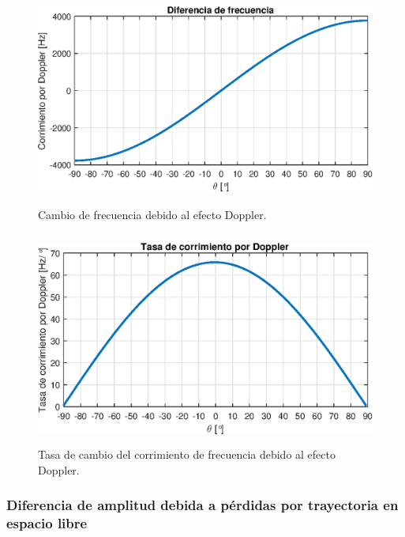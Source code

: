 \documentclass{article}
\newenvironment{standalone}{\begin{preview}}{\end{preview}}
\begin{document}
\begin{standalone}
  \begin{figure}[!htbp]
    \centering
    \includegraphics[width=\linewidth, height=70mm, keepaspectratio]{../images/doppler-shift.eps}
    \caption{Cambio de frecuencia debido al efecto Doppler.}
    \label{fig:doppler-shift}
  \end{figure}

  \begin{figure}[!htbp]
    \centering
    \includegraphics[width=\linewidth, height=70mm, keepaspectratio]{../images/doppler-shift-derivative.eps}
    \caption{Tasa de cambio del corrimiento de frecuencia debido al efecto Doppler.}
    \label{fig:doppler-shift-derivative}
  \end{figure}

  \subsubsection{Diferencia de amplitud debida a pérdidas por trayectoria en espacio libre}



\end{standalone}
\end{document}
